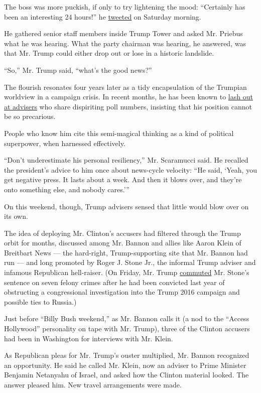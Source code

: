The boss was more puckish, if only to try lightening the mood:
``Certainly has been an interesting 24 hours!'' he
\href{https://twitter.com/realdonaldtrump/status/784767399442653184?lang=en}{tweeted}
on Saturday morning.

He gathered senior staff members inside Trump Tower and asked Mr.
Priebus what he was hearing. What the party chairman was hearing, he
answered, was that Mr. Trump could either drop out or lose in a historic
landslide.

``So,'' Mr. Trump said, ``what's the good news?''

The flourish resonates four years later as a tidy encapsulation of the
Trumpian worldview in a campaign crisis. In recent months, he has been
known to
\href{https://www.nytimes.com/2020/04/29/us/politics/trump-campaign-reelection-polls.html}{lash
out at advisers} who share dispiriting poll numbers, insisting that his
position cannot be so precarious.

People who know him cite this semi-magical thinking as a kind of
political superpower, when harnessed effectively.

``Don't underestimate his personal resiliency,'' Mr. Scaramucci said. He
recalled the president's advice to him once about news-cycle velocity:
``He said, `Yeah, you get negative press. It lasts about a week. And
then it blows over, and they're onto something else, and nobody
cares.'''

On this weekend, though, Trump advisers sensed that little would blow
over on its own.

The idea of deploying Mr. Clinton's accusers had filtered through the
Trump orbit for months, discussed among Mr. Bannon and allies like Aaron
Klein of Breitbart News --- the hard-right, Trump-supporting site that
Mr. Bannon had run --- and long promoted by Roger J. Stone Jr., the
informal Trump adviser and infamous Republican hell-raiser. (On Friday,
Mr. Trump
\href{https://www.nytimes.com/2020/07/10/us/politics/trump-roger-stone-clemency.html}{commuted}
Mr. Stone's sentence on seven felony crimes after he had been convicted
last year of obstructing a congressional investigation into the Trump
2016 campaign and possible ties to Russia.)

Just before ``Billy Bush weekend,'' as Mr. Bannon calls it (a nod to the
``Access Hollywood'' personality on tape with Mr. Trump), three of the
Clinton accusers had been in Washington for interviews with Mr. Klein.

As Republican pleas for Mr. Trump's ouster multiplied, Mr. Bannon
recognized an opportunity. He said he called Mr. Klein, now an adviser
to Prime Minister Benjamin Netanyahu of Israel, and asked how the
Clinton material looked. The answer pleased him. New travel arrangements
were made.

